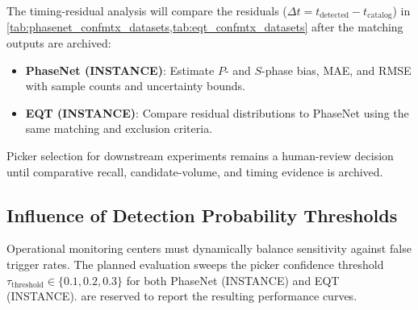 The timing-residual analysis will compare the residuals
($\Delta t = t_{\mathrm{detected}} - t_{\mathrm{catalog}}$) in
\cref{tab:phasenet_confmtx_datasets,tab:eqt_confmtx_datasets} after
the matching outputs are archived:
\begin{itemize}
  \item \textbf{\ac{PhaseNet} (\ac{INSTANCE})}: Estimate $P$- and $S$-phase
    bias, \ac{MAE}, and
    \ac{RMSE} with sample counts and uncertainty bounds.
  \item \textbf{\ac{EQT} (\ac{INSTANCE})}: Compare residual
    distributions to
    \ac{PhaseNet} using the same matching and exclusion criteria.
\end{itemize}

Picker selection for downstream experiments remains a human-review decision
until comparative recall, candidate-volume, and timing evidence is archived.

\subsection{Influence of Detection Probability Thresholds}
\label{subsec:picker_thresholds}

Operational monitoring centers must dynamically balance sensitivity
against false trigger rates. The planned evaluation sweeps the picker
confidence threshold $\tau_{\mathrm{threshold}} \in \{0.1, 0.2, 0.3\}$ for both
\ac{PhaseNet} (\ac{INSTANCE}) and \ac{EQT} (\ac{INSTANCE}).
 are
reserved to report the resulting
performance curves.

